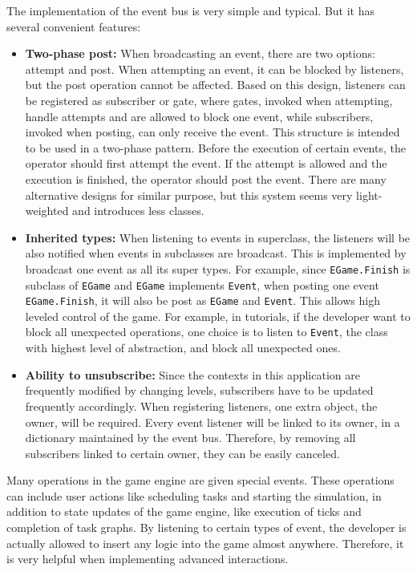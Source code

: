 \documentclass[msc,deptreport, cs]{infthesis}
\begin{document}
The implementation of the event bus is very simple and typical. But it has several convenient features:
\begin{itemize}
  \item \textbf{Two-phase post:} When broadcasting an event, there are two options: attempt and post. When attempting an event, it can be blocked by listeners, but the post operation cannot be affected. Based on this design, listeners can be registered as subscriber or gate, where gates, invoked when attempting, handle attempts and are allowed to block one event, while subscribers, invoked when posting, can only receive the event. This structure is intended to be used in a two-phase pattern. Before the execution of certain events, the operator should first attempt the event. If the attempt is allowed and the execution is finished, the operator should post the event. There are many alternative designs for similar purpose, but this system seems very light-weighted and introduces less classes.
  \item \textbf{Inherited types:} When listening to events in superclass, the listeners will be also notified when events in subclasses are broadcast. This is implemented by broadcast one event as all its super types. For example, since \verb+EGame.Finish+ is subclass of \verb+EGame+ and \verb+EGame+ implements \verb+Event+, when posting one event \verb+EGame.Finish+, it will also be post as \verb+EGame+ and \verb+Event+. This allows high leveled control of the game. For example, in tutorials, if the developer want to block all unexpected operations, one choice is to listen to \verb+Event+, the class with highest level of abstraction, and block all unexpected ones.
  \item \textbf{Ability to unsubscribe:} Since the contexts in this application are frequently modified by changing levels, subscribers have to be updated frequently accordingly. When registering listeners, one extra object, the owner, will be required. Every event listener will be linked to its owner, in a dictionary maintained by the event bus. Therefore, by removing all subscribers linked to certain owner, they can be easily canceled.
\end{itemize}

Many operations in the game engine are given special events. These operations can include user actions like scheduling tasks and starting the simulation, in addition to state updates of the game engine, like execution of ticks and completion of task graphs. By listening to certain types of event, the developer is actually allowed to insert any logic into the game almost anywhere. Therefore, it is very helpful when implementing advanced interactions.
\end{document}
